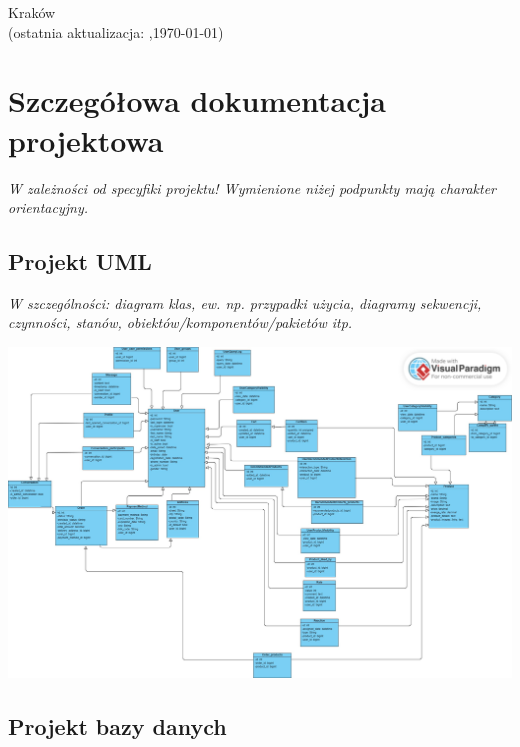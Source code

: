\documentclass[12pt,a4paper,oneside]{article}
\theoremstyle{definition}
\numberwithin{equation}{section}
\begin{document}
\begin{titlepage}
\vspace*{\fill}
\begin{center}
\large
Kraków \the\year\\
(ostatnia aktualizacja: \DTMcurrenttime,\;\today)
\end{center}
\end{titlepage}
\setcounter{page}{0} 
\newpage\null\thispagestyle{empty}

\tableofcontents


\newpage

\section{Szczegółowa dokumentacja projektowa}
\textit{W zależności od specyfiki projektu! Wymienione niżej podpunkty mają charakter orientacyjny.}
\subsection{Projekt UML}
\textit{W szczególności: diagram klas, ew. np. przypadki użycia, diagramy sekwencji, czynności, stanów, obiektów/komponentów/pakietów itp.}
\begin{center}
\centering \includegraphics[width=1.0\columnwidth]{images/UML.jpg}
\end{center}

\subsection{Projekt bazy danych}
\end{document}
